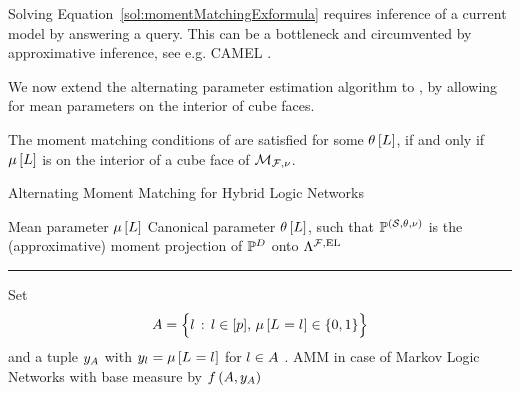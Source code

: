 Solving Equation~\ref{sol:momentMatchingExformula} requires inference of a current model by answering a query.
This can be a bottleneck and circumvented by approximative inference, see e.g. CAMEL \cite{ganapathi_constrained_2008}.

\subsect{\HybridLogicNetworks{}}

We now extend the alternating parameter estimation algorithm to \HybridLogicNetworks{}, by allowing for mean parameters on the interior of cube faces.

\begin{lemma}
    The moment matching conditions of  are satisfied for some $\theta\left[L\right]$, if and only if $\mu\left[L\right]$ is on the interior of a cube face of $\mathcal{M}_{\mathcal{F},\nu}$.
\end{lemma}

\begin{algorithm}[hbt!]
    \caption{Alternating Moment Matching for Hybrid Logic Networks}
    \begin{algorithmic}
        \Require Mean parameter $\mu\left[L\right]$ %
        \Ensure Canonical parameter $\theta\left[L\right]$, such that $\mathbb{P}^{(\mathcal{S},\theta,\nu)}$ is the (approximative) moment projection of $\mathbb{P}^{D}$ onto $\Lambda^{\mathcal{F},\mathrm{EL}}$
        \hrule
        \State Set
            \[ A = \Big\{ l \,:\, l\in[p] ,\, \mu\left[L_{}=l_{}\right]\in\{0,1\} \Big\}\]
            and a tuple $y_{A}$ with $y_{l}=\mu\left[L_{}=l_{}\right]$ for $l\in A$ .
        \State \Return AMM in case of Markov Logic Networks with base measure by $f\left(A,y_{A}\right)$
    \end{algorithmic}
\end{algorithm}







